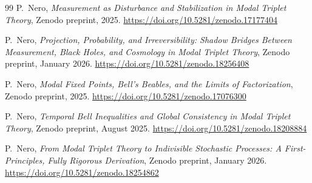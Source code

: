 \documentclass[11pt]{article}
\begin{document}
\begin{thebibliography}{99}
P.~Nero,
\emph{Measurement as Disturbance and Stabilization in Modal Triplet Theory},
Zenodo preprint, 2025.
\url{https://doi.org/10.5281/zenodo.17177404}

P.~Nero,
\emph{Projection, Probability, and Irreversibility: Shadow Bridges Between Measurement, Black Holes, and Cosmology in Modal Triplet Theory},
Zenodo preprint, January 2026.
\url{https://doi.org/10.5281/zenodo.18256408}

P.~Nero,
\emph{Modal Fixed Points, Bell’s Beables, and the Limits of Factorization},
Zenodo preprint, 2025.
\url{https://doi.org/10.5281/zenodo.17076300}

P.~Nero,
\emph{Temporal Bell Inequalities and Global Consistency in Modal Triplet Theory},
Zenodo preprint, August 2025.
\url{https://doi.org/10.5281/zenodo.18208884}

P.~Nero,
\emph{From Modal Triplet Theory to Indivisible Stochastic Processes: A First-Principles, Fully Rigorous Derivation},
Zenodo preprint, January 2026.
\url{https://doi.org/10.5281/zenodo.18254862}

\end{thebibliography}
\end{document}
